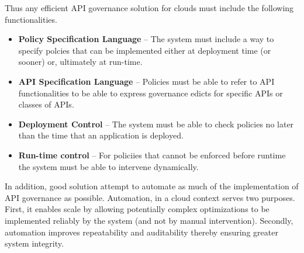 Thus any efficient API governance solution for clouds must include the
following functionalities.
\begin{itemize}
\item {\bf Policy Specification Language} -- The system must include a way to
specify polcies that can be implemented either at deployment time (or sooner)
or, ultimately at run-time.  
\item {\bf API Specification Language} -- Policies must be able to refer to
API functionalities to be able to express governance edicts for specific APIs
or classes of APIs.
\item {\bf Deployment Control} --  The system must be able to check policies
no later than the time that an application is deployed.
\item {\bf Run-time control} -- For policiies that cannot be enforced before
runtime the system must be able to intervene dynamically.
\end{itemize}
In addition, good solution attempt to automate as much of the implementation
of API governance as possible.  Automation, in a cloud context serves two
purposes.  First, it enables scale by allowing potentially complex
optimizations to be implemented reliably by the system (and not by manual
intervention).  Secondly, automation improves repeatability and auditability
thereby ensuring greater system integrity.
